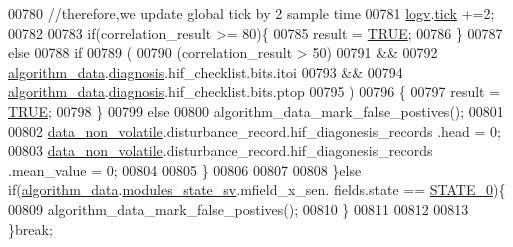 \begin{DoxyCode}
00780                                \textcolor{comment}{//therefore,we update global tick by 2 sample time}
00781                                \hyperlink{a00038_a2e89c46668b39a17753c238950c9e1ec}{logv}.\hyperlink{a00021_a81f0ce68c2c483fb8df726cc1988d8e8}{tick} +=2;
00782 
00783                                  \textcolor{keywordflow}{if}(correlation\_result >= 80)\{
00785                                      result = \hyperlink{a00040_aa8cecfc5c5c054d2875c03e77b7be15d}{TRUE};
00786                                  \}
00787                                  \textcolor{keywordflow}{else}
00788                                  \textcolor{keywordflow}{if}
00789                                  (
00790                                  (correlation\_result > 50)
00791                                  &&
00792                                  \hyperlink{a00038_a183caa40cd01e79ee309cc9c4a225197}{algorithm\_data}.\hyperlink{a00016_a16f85d57ec98b4ad05f5a2e10536b3c6}{diagnosis}.hif\_checklist.bits.itoi
00793                                  &&
00794                                  \hyperlink{a00038_a183caa40cd01e79ee309cc9c4a225197}{algorithm\_data}.\hyperlink{a00016_a16f85d57ec98b4ad05f5a2e10536b3c6}{diagnosis}.hif\_checklist.bits.ptop
00795                                  )
00796                                 \{
00797                                   result = \hyperlink{a00040_aa8cecfc5c5c054d2875c03e77b7be15d}{TRUE};
00798                                 \}
00799                                  \textcolor{keywordflow}{else}
00800                                 algorithm\_data\_mark\_false\_postives();
00801 
00802                                \hyperlink{a00060_a76ac5f917f5308dcd83de0d7c94559fb}{data\_non\_volatile}.disturbance\_record.hif\_diagonesis\_records
      .head = 0;
00803                                \hyperlink{a00060_a76ac5f917f5308dcd83de0d7c94559fb}{data\_non\_volatile}.disturbance\_record.hif\_diagonesis\_records
      .mean\_value = 0;
00804 
00805                            \}
00806 
00807                                     
00808                       \}\textcolor{keywordflow}{else} \textcolor{keywordflow}{if}(\hyperlink{a00038_a183caa40cd01e79ee309cc9c4a225197}{algorithm\_data}.\hyperlink{a00016_a293140e240bbd54f7601adbc9194148c}{modules\_state\_sv}.mfield\_x\_sen.
      fields.state == \hyperlink{a00021_ad6739dbbe5581cac99b7dc8a5e09949c}{STATE\_0})\{
00809                             algorithm\_data\_mark\_false\_postives();
00810                       \} 
00811                        
00812 
00813                 \}\textcolor{keywordflow}{break};

\end{DoxyCode}
